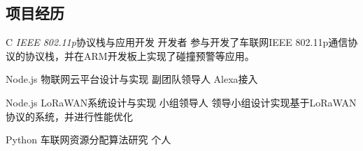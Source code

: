 \documentclass[10pt]{article} %
\begin{document}
\begin{paracol}{2}
	\section{项目经历}
	
	
	
	
	
	{C} %
	{\textit{IEEE 802.11p}协议栈与应用开发} %
	{开发者} %
	{参与开发了车联网IEEE 802.11p通信协议的协议栈，并在ARM开发板上实现了碰撞预警等应用。}
	
	
	{Node.js} %
	{物联网云平台设计与实现} %
	{副团队领导人} %
	{Alexa接入}  %
	
	{Node.js} %
	{LoRaWAN\texttrademark 系统设计与实现} %
	{小组领导人} %
	{领导小组设计实现基于LoRaWAN\texttrademark 协议的系统，并进行性能优化}  %
	
	{Python} %
	{车联网资源分配算法研究} %
	{个人} %
	{} %
	
	
	\vspace{-\baselineskip}\medskip %
	
	

\end{paracol}
\end{document}
